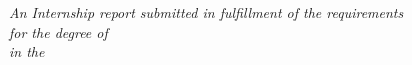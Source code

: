 \documentclass[
12pt, %
oneside, %
english, %
singlespacing, %
liststotoc, %
toctotoc, %
headsepline, %
]{MastersDoctoralThesis} %
\author{Raphaël \textsc{Abellan--Romita}} %
\subtitle{Obstacle avoidance with robust path generation}%
\begin{document}
\frontmatter %

\pagestyle{plain} %

\begin{titlepage} %

	\raggedleft %

	\vspace*{\baselineskip} %


	{\Large \href{http://origanimes.free.fr/}{\authorname}} %

	\vspace*{0.167\textheight} %


	\textbf{\LARGE \subjectname}\\[\baselineskip] %

	{\textcolor{mdtRed}{\Huge \ttitle}}\\[\baselineskip] %

	{\Large \textit{\subtitlename}} %

	\vfill %

  \large \textit{An Internship report submitted in fulfillment of the requirements\\ for the degree of \degreename}\\[0.3cm] %
  \textit{in the}\\[0.4cm]
  \deptname\\\groupname\\[2cm] %

	\vspace*{3\baselineskip} %

\end{titlepage}
\end{document}

